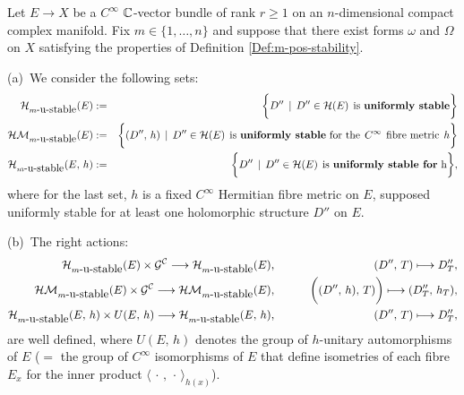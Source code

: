 \documentclass[12pt]{article}
\begin{document}
\begin{Cor-Def}\label{Cor-Def:m-pos-stable_moduli} Let $E\longrightarrow X$ be a $C^\infty$ $\mathbb{C}$-vector bundle of rank $r\geq 1$ on an $n$-dimensional compact complex manifold. Fix $m\in\{1,\dots , n\}$ and suppose that there exist forms $\omega$ and $\Omega$ on $X$ satisfying the properties of Definition \ref{Def:m-pos-stability}.

\vspace{1ex}

(a)\, We consider the following sets: \begin{eqnarray*}{\cal H}_{m\mbox{-u-stable}}(E) &:= &\bigg\{D''\,\mid\, D''\in{\cal H}(E) \hspace{1ex} \mbox{is {\bf uniformly stable}}\bigg\}\\
  {\cal HM}_{m\mbox{-u-stable}}(E) &:= & \bigg\{(D'',\,h)\,\mid\, D''\in{\cal H}(E) \hspace{1ex} \mbox{is {\bf uniformly stable} for the}\hspace{1ex} C^\infty \hspace{1ex} \mbox{fibre metric} \hspace{1ex} h\bigg\} \\
 {\cal H}_{m\mbox{-u-stable}}(E,\,h) &:=& \bigg\{D''\,\mid\, D''\in{\cal H}(E) \hspace{1ex} \mbox{is {\bf uniformly stable for} h}\bigg\},\end{eqnarray*} where for the last set, $h$ is a fixed $C^\infty$ Hermitian fibre metric on $E$, supposed uniformly stable for at least one holomorphic structure $D''$ on $E$.  

\vspace{1ex}

(b)\, The right actions: \begin{eqnarray*}{\cal H}_{m\mbox{-u-stable}}(E)\times{\cal G}^{\cal C} \longrightarrow {\cal H}_{m\mbox{-u-stable}}(E), & \hspace{5ex} & (D'',\, T)\longmapsto D''_T,\\
  {\cal HM}_{m\mbox{-u-stable}}(E)\times{\cal G}^{\cal C} \longrightarrow {\cal HM}_{m\mbox{-u-stable}}(E), & \hspace{5ex} & \bigg((D'',\, h),\, T)\bigg)\longmapsto(D''_T,\, h_T),\\
 {\cal H}_{m\mbox{-u-stable}}(E,\,h)\times U(E,\,h)\longrightarrow{\cal H}_{m\mbox{-u-stable}}(E,\,h), & \hspace{5ex} & (D'',\, T)\longmapsto D''_T,\end{eqnarray*} are well defined, where $U(E,\,h)$ denotes the group of $h$-unitary automorphisms of $E$ ($=$ the group of $C^\infty$ isomorphisms of $E$ that define isometries of each fibre $E_x$ for the inner product $\langle\,\cdot\,,\,\cdot\,\rangle_{h(x)}$).


\end{Cor-Def}
\end{document}
